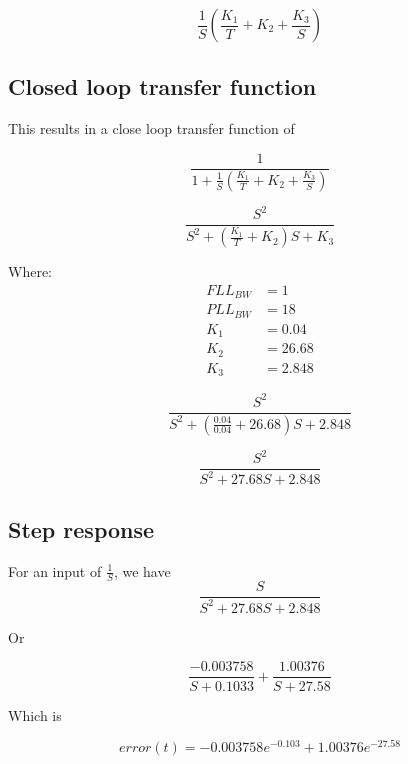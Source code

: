 \begin{equation}
\frac{1}{S} (\frac{K_1}{T} + K_2 +  \frac{K_3}{S})
\end{equation}

 
\subsection{Closed loop transfer function}
This results in a close loop transfer function of 

\begin{equation}
\frac{1}{1+\frac{1}{S} (\frac{K_1}{T} + K_2 +  \frac{K_3}{S})}
\end{equation}



\begin{equation}
\frac{S^2}{S^2 + (\frac{K_1}{T} + K_2)S + K_3}
\end{equation}

Where:
\begin{align*}
FLL_{BW} &=1\\
PLL_{BW} &=18\\
K_1 &=  0.04\\
K_2 &= 26.68\\
K_3 &=  2.848
\end{align*}


\begin{equation}
\frac{S^2}{S^2 + (\frac{0.04}{0.04} +  26.68)S + 2.848}
\end{equation}

\begin{equation}
\frac{S^2}{S^2 + 27.68 S + 2.848}
\end{equation}

\subsection{Step response}

For an input of $\frac{1}{S}$, we have 
\begin{equation}
\frac{S}{S^2 + 27.68 S + 2.848}
\end{equation}

Or 

\begin{equation}
\frac{-0.003758}{S+0.1033} + \frac{1.00376}{S+27.58}
\end{equation}

Which is

\begin{equation}
error(t) =  -0.003758 e^{-0.103} + 1.00376 e^{-27.58}
\end{equation}


